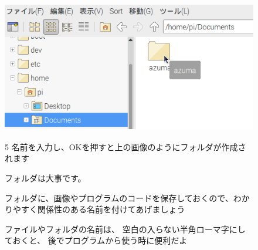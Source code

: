\documentclass[a4paper,12pt]{jarticle}
\begin{document}
\begin{figure}[hb]
  \centering
  \includegraphics[width=11.398cm,height=5.72cm]{textbook-img038.png}
  \centering
  \begin{minipage}{13.001cm}
    5
    名前を入力し、OKを押すと上の画像のようにフォルダが作成されます
  \end{minipage}

\end{figure}
\begin{figure}[hb]
  \centering
  \begin{minipage}{0.8\textwidth}
    {	\large
      フォルダは大事です。

      フォルダに、画像やプログラムのコードを保存しておくので、わかりやすく関係性のある名前を付けてあげましょう

      \bigskip
      ファイルやフォルダの名前は、
      空白の入らない半角ローマ字にしておくと、
      後でプログラムから使う時に便利だよ
    }
  \end{minipage}
\end{figure}
\clearpage
\end{document}
